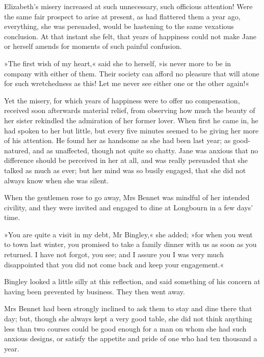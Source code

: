 Elizabeth's misery increased at such unnecessary, such officious attention! Were the same fair prospect to arise at present, as had flattered them a year ago, everything, she was persuaded, would be hastening to the same vexatious conclusion. At that instant she felt, that years of happiness could not make Jane or herself amends for moments of such painful confusion.

»The first wish of my heart,« said she to herself, »is never more to be in company with either of them. Their society can afford no pleasure that will atone for such wretchedness as this! Let me never see either one or the other again!«

Yet the misery, for which years of happiness were to offer no compensation, received soon afterwards material relief, from observing how much the beauty of her sister rekindled the admiration of her former lover. When first he came in, he had spoken to her but little, but every five minutes seemed to be giving her more of his attention. He found her as handsome as she had been last year; as good-natured, and as unaffected, though not quite so chatty. Jane was anxious that no difference should be perceived in her at all, and was really persuaded that she talked as much as ever; but her mind was so busily engaged, that she did not always know when she was silent.

When the gentlemen rose to go away, Mrs Bennet was mindful of her intended civility, and they were invited and engaged to dine at Longbourn in a few days' time.

»You are quite a visit in my debt, Mr Bingley,« she added; »for when you went to town last winter, you promised to take a family dinner with us as soon as you returned. I have not forgot, you see; and I assure you I was very much disappointed that you did not come back and keep your engagement.«

Bingley looked a little silly at this reflection, and said something of his concern at having been prevented by business. They then went away.

Mrs Bennet had been strongly inclined to ask them to stay and dine there that day; but, though she always kept a very good table, she did not think anything less than two courses could be good enough for a man on whom she had such anxious designs, or satisfy the appetite and pride of one who had ten thousand a year.